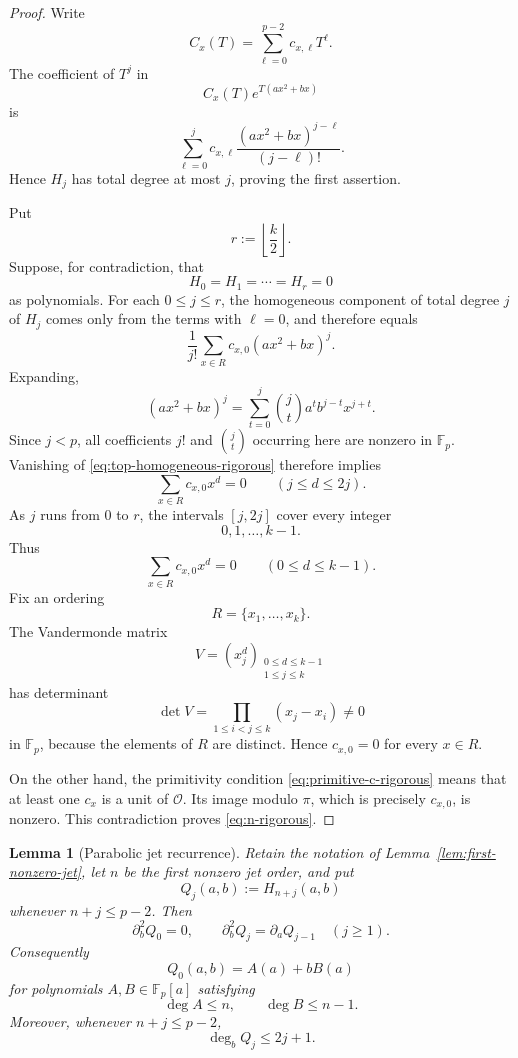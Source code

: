 \documentclass[11pt]{article}
\newtheorem{lemma}[theorem]{Lemma}
\newcommand{\F}{\mathbb F}
\begin{document}
\begin{proof}
Write
\[
 C_x(T)=\sum_{\ell=0}^{p-2}c_{x,\ell}T^\ell.
\]
The coefficient of \(T^j\) in
\[
 C_x(T)e^{T(a x^2+b x)}
\]
is
\[
 \sum_{\ell=0}^{j}
 c_{x,\ell}
 \frac{(a x^2+b x)^{j-\ell}}{(j-\ell)!}.
\]
Hence \(H_j\) has total degree at most \(j\), proving the first assertion.

Put
\[
 r:=\left\lfloor\frac{k}{2}\right\rfloor.
\]
Suppose, for contradiction, that
\[
 H_0=H_1=\cdots=H_r=0
\]
as polynomials.  For each \(0\le j\le r\), the homogeneous component of
total degree \(j\) of \(H_j\) comes only from the terms with
\(\ell=0\), and therefore equals
\begin{equation}
 \frac1{j!}
 \sum_{x\in R}
 c_{x,0}(a x^2+b x)^j.
 \label{eq:top-homogeneous-rigorous}
\end{equation}
Expanding,
\[
 (a x^2+b x)^j
 =
 \sum_{t=0}^{j}
 \binom jt
 a^t b^{j-t}x^{j+t}.
\]
Since \(j<p\), all coefficients \(j!\) and \(\binom jt\) occurring here
are nonzero in \(\F_p\).  Vanishing of
\eqref{eq:top-homogeneous-rigorous} therefore implies
\begin{equation}
 \sum_{x\in R}c_{x,0}x^d=0
 \qquad
 (j\le d\le2j).
 \label{eq:moment-window}
\end{equation}
As \(j\) runs from \(0\) to \(r\), the intervals
\([j,2j]\) cover every integer
\[
 0,1,\ldots,k-1.
\]
Thus
\[
 \sum_{x\in R}c_{x,0}x^d=0
 \qquad(0\le d\le k-1).
\]
Fix an ordering
\[
 R=\{x_1,\ldots,x_k\}.
\]
The Vandermonde matrix
\[
 V=(x_j^d)_{\substack{0\le d\le k-1\\1\le j\le k}}
\]
has determinant
\[
 \det V=\prod_{1\le i<j\le k}(x_j-x_i)\ne0
\]
in \(\F_p\), because the elements of \(R\) are distinct.  Hence
\(c_{x,0}=0\) for every \(x\in R\).

On the other hand, the primitivity condition
\eqref{eq:primitive-c-rigorous} means that at least one \(c_x\) is a unit
of \(\mathcal O\).  Its image modulo \(\pi\), which is precisely
\(c_{x,0}\), is nonzero.  This contradiction proves
\eqref{eq:n-rigorous}.
\end{proof}

\begin{lemma}[Parabolic jet recurrence]
\label{lem:schrodinger-jet}
Retain the notation of Lemma~\ref{lem:first-nonzero-jet}, let \(n\) be
the first nonzero jet order, and put
\[
 Q_j(a,b):=H_{n+j}(a,b)
\]
whenever \(n+j\le p-2\).  Then
\begin{equation}
 \partial_b^2Q_0=0,
 \qquad
 \partial_b^2Q_j=\partial_aQ_{j-1}
 \quad(j\ge1).
 \label{eq:schrodinger-recurrence-rigorous}
\end{equation}
Consequently
\begin{equation}
 Q_0(a,b)=A(a)+bB(a)
 \label{eq:leading-pencil-rigorous}
\end{equation}
for polynomials \(A,B\in\F_p[a]\) satisfying
\begin{equation}
 \deg A\le n,
 \qquad
 \deg B\le n-1.
 \label{eq:AB-degree-rigorous}
\end{equation}
Moreover, whenever \(n+j\le p-2\),
\begin{equation}
 \deg_bQ_j\le2j+1.
 \label{eq:b-degree-rigorous}
\end{equation}
\end{lemma}
\end{document}
